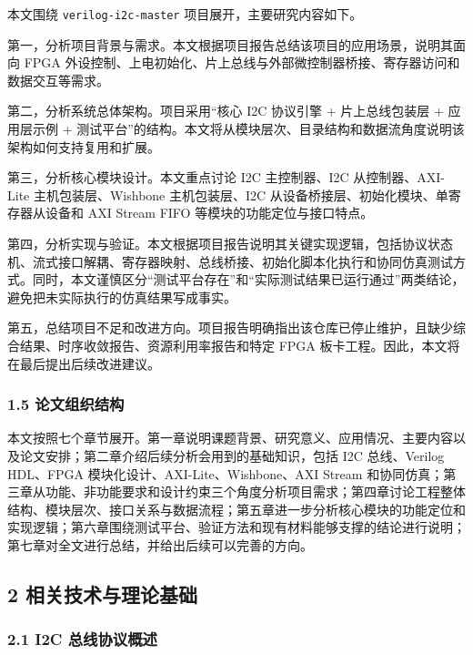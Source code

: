 本文围绕 \texttt{verilog-i2c-master} 项目展开，主要研究内容如下。

第一，分析项目背景与需求。本文根据项目报告总结该项目的应用场景，说明其面向 FPGA 外设控制、上电初始化、片上总线与外部微控制器桥接、寄存器访问和数据交互等需求。

第二，分析系统总体架构。项目采用``核心 I2C 协议引擎 + 片上总线包装层 + 应用层示例 + 测试平台''的结构。本文将从模块层次、目录结构和数据流角度说明该架构如何支持复用和扩展。

第三，分析核心模块设计。本文重点讨论 I2C 主控制器、I2C 从控制器、AXI-Lite 主机包装层、Wishbone 主机包装层、I2C 从设备桥接层、初始化模块、单寄存器从设备和 AXI Stream FIFO 等模块的功能定位与接口特点。

第四，分析实现与验证。本文根据项目报告说明其关键实现逻辑，包括协议状态机、流式接口解耦、寄存器映射、总线桥接、初始化脚本化执行和协同仿真测试方式。同时，本文谨慎区分``测试平台存在''和``实际测试结果已运行通过''两类结论，避免把未实际执行的仿真结果写成事实。

第五，总结项目不足和改进方向。项目报告明确指出该仓库已停止维护，且缺少综合结果、时序收敛报告、资源利用率报告和特定 FPGA 板卡工程。因此，本文将在最后提出后续改进建议。

\subsubsection{1.5 论文组织结构}\label{ux8bbaux6587ux7ec4ux7ec7ux7ed3ux6784}

本文按照七个章节展开。第一章说明课题背景、研究意义、应用情况、主要内容以及论文安排；第二章介绍后续分析会用到的基础知识，包括 I2C 总线、Verilog HDL、FPGA 模块化设计、AXI-Lite、Wishbone、AXI Stream 和协同仿真；第三章从功能、非功能要求和设计约束三个角度分析项目需求；第四章讨论工程整体结构、模块层次、接口关系与数据流程；第五章进一步分析核心模块的功能定位和实现逻辑；第六章围绕测试平台、验证方法和现有材料能够支撑的结论进行说明；第七章对全文进行总结，并给出后续可以完善的方向。

\subsection{2 相关技术与理论基础}\label{ux76f8ux5173ux6280ux672fux4e0eux7406ux8bbaux57faux7840}

\subsubsection{2.1 I2C 总线协议概述}\label{i2c-ux603bux7ebfux534fux8baeux6982ux8ff0}

